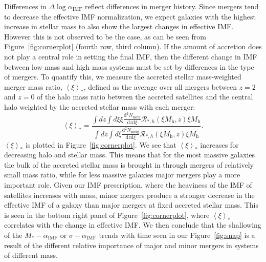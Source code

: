 \documentclass[usenatbib, letters]{mnras}
\def\mhalo{M_{\mathrm{h}}}
\def\aimf{\alpha_{\mathrm{IMF}}}
\def\Fref#1{Figure~\ref{#1}\xspace}
\begin{document}
Differences in $\Delta\log{\aimf}$ reflect differences in merger history.
Since mergers tend to decrease the effective IMF normalization, we expect galaxies with the highest increase in stellar mass to also show the largest changes in effective IMF. However this is not observed to be the case, as can be seen from \Fref{fig:cornerplot} (fourth row, third column).
If the amount of accretion does not play a central role in setting the final IMF, then the different change in IMF between low mass and high mass systems must be set by differences in the type of mergers. To quantify this, we measure the accreted stellar mass-weighted merger mass ratio, $\left< \xi \right>_*$, defined as the average over all mergers between $z=2$ and $z=0$ of the halo mass ratio between the accreted satellites and the central halo weighted by the accreted stellar mass with each merger: 
\begin{equation}\label{eq:xieff}
\left< \xi \right>_* = \frac{\int dz \int d\xi \xi \frac{\mathrm{d}^2N_{\mathrm{merg}}}{\mathrm{d}z \mathrm{d}\xi} \mathcal{R}_{*,h}(\xi \mhalo, z)\xi\mhalo}{\int dz \int d\xi  \frac{\mathrm{d}^2N_{\mathrm{merg}}}{\mathrm{d}z \mathrm{d}\xi} \mathcal{R}_{*,h}(\xi \mhalo, z)\xi\mhalo}.
\end{equation}
$\left< \xi \right>_*$ is plotted in \Fref{fig:cornerplot}. We see that $\left< \xi \right>_*$ increases for decreasing halo and stellar mass.
This means that for the most massive galaxies the bulk of the accreted stellar mass is brought in through mergers of relatively small mass ratio, while for less massive galaxies major mergers play a more important role.
Given our IMF prescription, where the heaviness of the IMF of satellites increases with mass, minor mergers produce a stronger decrease in the effective IMF of a galaxy than major mergers at fixed accreted stellar mass. 
This is seen in the bottom right panel of \Fref{fig:cornerplot}, where $\left< \xi \right>_*$ correlates with the change in effective IMF.
We then conclude that the shallowing of the $M_*-\aimf$ or $\sigma-\aimf$ trends with time seen in our \Fref{fig:snap} is a result of the different relative importance of major and minor mergers in systems of different mass.
\end{document}
